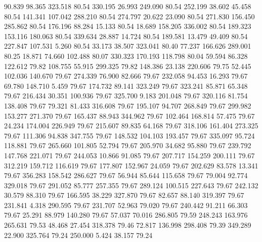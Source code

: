   90.839   98.365  323.518        80.54
 330.195   26.993  249.090        80.54
 252.199   38.602   45.458        80.54
 141.341  107.042  288.210        80.54
 274.797   20.622   23.090        80.54
 271.830  156.450  285.862        80.54
 176.196   88.284   15.133        80.54
  18.689  158.205  336.002        80.54
 189.323  153.116  180.063        80.54
 339.634   28.887   14.724        80.54
 189.581   13.479   49.409        80.54
 227.847  107.531    5.260        80.54
  33.173   38.507  323.041        80.40
  77.237  166.626  289.001        80.25
  18.871   74.660  102.488        80.07
 330.323  170.193  118.798        80.04
  59.594   86.328  122.612        79.82
 108.755   55.915  299.325        79.82
 148.386   23.138  220.606        79.75
  52.445  102.036  140.670        79.67
 274.339   76.900   82.666        79.67
 232.058   94.453   16.293        79.67
  69.780  148.710    5.459        79.67
 174.732   89.141  323.249        79.67
 323.241   85.871   65.348        79.67
 216.434   30.351  100.936        79.67
 325.700    9.183  201.048        79.67
 320.116   81.754  138.408        79.67
  79.321   81.433  316.608        79.67
 195.107   94.707  268.849        79.67
 299.982  153.277  271.370        79.67
 165.437   88.943  344.962        79.67
 102.464  168.814   57.475        79.67
  24.234  174.004  226.949        79.67
 215.607   89.835   64.168        79.67
 318.106  161.404  273.325        79.67
 111.306   94.838  347.755        79.67
 148.532  104.103  193.457        79.67
 335.097   95.724  118.881        79.67
 265.660  101.805   52.794        79.67
 205.970   34.682   95.880        79.67
 239.792  147.768  221.071        79.67
 244.053   10.866   91.085        79.67
 207.717  154.259  200.111        79.67
 312.219  159.712  116.619        79.67
 177.807  152.967   24.059        79.67
 202.629   83.578   13.341        79.67
 356.283  158.542  286.627        79.67
  56.944   85.644  115.658        79.67
  79.004   92.774  329.018        79.67
 291.052   85.777  257.355        79.67
 289.124  100.515  227.643        79.67
 242.132   30.579   88.310        79.67
 166.595   38.229  327.870        79.67
  82.657   88.140  319.397        79.67
 231.841    4.318  290.595        79.67
 231.707   52.963   79.020        79.67
 240.442   91.211   66.303        79.67
  25.291   88.979  140.280        79.67
  57.037   70.016  286.805        79.59
 248.243  163.976  265.631        79.53
  48.468   27.454  318.378        79.46
  72.817  136.998  298.408        79.39
 349.289   22.900  325.764        79.24
 250.000    5.424   38.157        79.24
